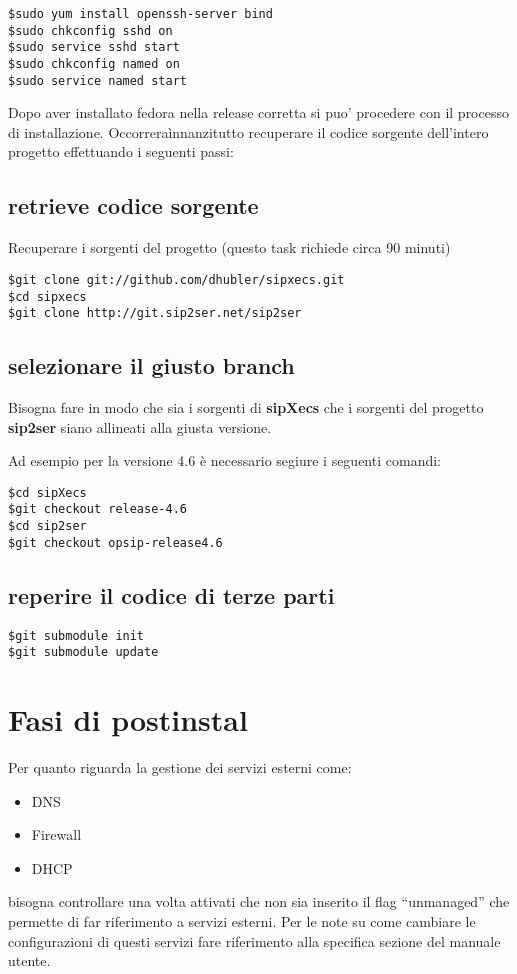 \begin{verbatim}
$sudo yum install openssh-server bind
$sudo chkconfig sshd on
$sudo service sshd start
$sudo chkconfig named on 
$sudo service named start
\end{verbatim}

Dopo aver installato fedora nella release corretta si puo' procedere con il processo di installazione. Occorrera\` innanzitutto recuperare il codice sorgente dell'intero progetto effettuando i seguenti passi:

\subsection{retrieve codice sorgente}

Recuperare i sorgenti del progetto (questo task richiede circa 90 minuti) 

\begin{verbatim}
$git clone git://github.com/dhubler/sipxecs.git
$cd sipxecs  
$git clone http://git.sip2ser.net/sip2ser
\end{verbatim}


\subsection{selezionare il giusto branch}

Bisogna fare in modo che sia i sorgenti di \textbf{sipXecs} che i sorgenti del progetto \textbf{sip2ser} siano allineati alla giusta versione.

Ad esempio per la versione 4.6 \`e necessario segiure i seguenti comandi:

\begin{verbatim}
$cd sipXecs
$git checkout release-4.6
$cd sip2ser
$git checkout opsip-release4.6
\end{verbatim}

\subsection{reperire il codice di terze parti}

\begin{verbatim} 
$git submodule init 
$git submodule update
\end{verbatim}


\section{Fasi di postinstal}

Per quanto riguarda la gestione dei servizi esterni come:

\begin{itemize}
\item DNS
\item Firewall
\item DHCP
\end{itemize}

bisogna controllare una volta attivati che non sia inserito il flag ``unmanaged'' che permette di far riferimento a servizi esterni.
Per le note su come cambiare le configurazioni di questi servizi fare riferimento alla specifica sezione del manuale utente.
